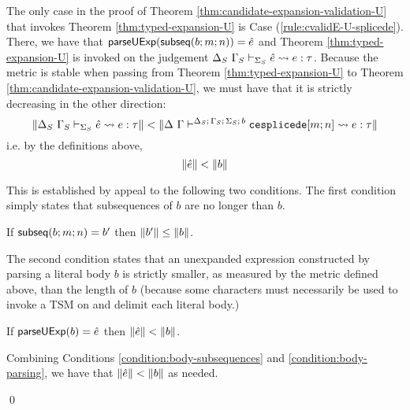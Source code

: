 The only case in the proof of Theorem \ref{thm:candidate-expansion-validation-U} that invokes Theorem \ref{thm:typed-expansion-U} is Case (\ref{rule:cvalidE-U-splicede}). There, we have that $\mathsf{parseUExp}(\mathsf{subseq}(b; m; n))=\hat{e}$ and Theorem \ref{thm:typed-expansion-U} is invoked on the judgement $\Delta_S~\Gamma_S \vdash_{\Sigma_S} \hat{e} \leadsto e : \tau$. Because the metric is stable when passing from Theorem \ref{thm:typed-expansion-U} to Theorem \ref{thm:candidate-expansion-validation-U}, we must have that it is strictly decreasing in the other direction:
\[\Vert \Delta_S~\Gamma_S \vdash_{\Sigma_S} \hat{e} \leadsto e : \tau \Vert < \Vert \Delta~\Gamma\vdash^{\Delta_S;\,\Gamma_S;\,\Sigma_S;\,b} \texttt{cesplicede}[m; n] \leadsto e : \tau \Vert\]
i.e. by the definitions above, 
\[\Vert \hat{e} \Vert < \Vert b \Vert\]

This is established by appeal to the following two conditions. The first condition simply states that subsequences of $b$ are no longer than $b$.
\begin{condition}\label{condition:body-subsequences} If $\mathsf{subseq}(b; m; n)=b'$ then $\Vert b' \Vert \leq \Vert b \Vert$. \end{condition}
The second condition states that an unexpanded expression constructed by parsing a literal body $b$ is strictly smaller, as measured by the metric defined above, than the length of $b$ (because some characters must necessarily be used to invoke a TSM on and delimit each literal body.)
\begin{condition}\label{condition:body-parsing} If $\mathsf{parseUExp}(b)=\hat{e}$ then $\Vert \hat{e} \Vert < \Vert b \Vert$.\end{condition}

Combining Conditions \ref{condition:body-subsequences} and \ref{condition:body-parsing}, we have that $\Vert \hat{e} \Vert < \Vert b \Vert$ as needed.

\qed

